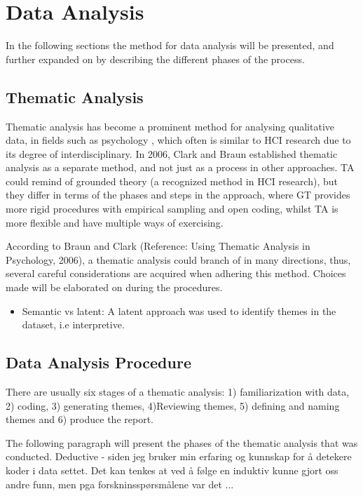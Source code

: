 \section{Data Analysis}
In the following sections the method for data analysis will be presented, and further expanded on by describing the different phases of the process.  
    \subsection{Thematic Analysis}
    Thematic analysis has become a prominent method for analysing qualitative data, in fields such as psychology \cite{braun_using_2006}, which often is similar to HCI research due to its degree of interdisciplinary. In 2006, Clark and Braun established thematic analysis as a separate method, and not just as a process in other approaches. TA could remind of grounded theory (a recognized method in HCI research), but they differ in terms of the phases and steps in the approach, where GT provides more rigid procedures with empirical sampling and open coding, whilst TA is more flexible and have multiple ways of exercising. 

According to Braun and Clark (Reference: Using Thematic Analysis in Psychology, 2006), a thematic analysis could branch of in many directions, thus, several careful considerations are acquired when adhering this method. Choices made will be elaborated on during the procedures.   
    
\begin{itemize}
\item     Semantic vs latent: A latent approach was used to identify themes in the dataset, i.e interpretive.
\end{itemize}
    
    \subsection{Data Analysis Procedure}
    There are usually six stages of a thematic analysis: 1) familiarization with data, 2) coding, 3) generating themes, 4)Reviewing themes, 5) defining and naming themes and 6) produce the report.
    
    The following paragraph will present the phases of the thematic analysis that was conducted. 
    Deductive - siden jeg bruker min erfaring og kunnskap for å detekere koder i data settet. Det kan tenkes at ved å følge en induktiv kunne gjort oss andre funn, men pga forskninsspørsmålene var det ...
    
